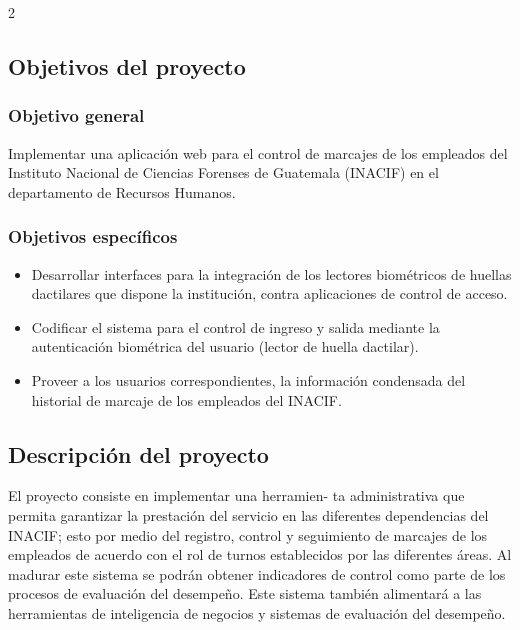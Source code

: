 \documentclass[12pt,spanish,Letterpaper,openany]{book}
\providecommand{\tightlist}{%
  \setlength{\itemsep}{0pt}\setlength{\parskip}{0pt}}
\begin{document}
\begin {multicols}{2}
\begin {flushleft}
\begin{minipage}[c]{\columnwidth}
\end{minipage}

\end {flushleft}

\hypertarget{objetivos-del-proyecto}{%
\subsection{Objetivos del proyecto}\label{objetivos-del-proyecto}}

\hypertarget{objetivo-general}{%
\subsubsection{Objetivo general}\label{objetivo-general}}

Implementar una aplicación web para el control de marcajes de los empleados del Instituto Nacional de Ciencias Forenses de Guatemala (INACIF) en el departamento de Recursos Humanos.

\hypertarget{objetivos-especuxedficos}{%
\subsubsection{Objetivos específicos}\label{objetivos-especuxedficos}}

\begin{itemize}
\tightlist
\item
  Desarrollar interfaces para la integración de los lectores biométricos de huellas
  dactilares que dispone la institución, contra aplicaciones de control de acceso.
\item
  Codificar el sistema para el control de ingreso y salida mediante la
  autenticación biométrica del usuario (lector de huella dactilar).
\item
  Proveer a los usuarios correspondientes, la información condensada del historial
  de marcaje de los empleados del INACIF.
\end{itemize}

\hypertarget{descripciuxf3n-del-proyecto}{%
\subsection{Descripción del proyecto}\label{descripciuxf3n-del-proyecto}}

El proyecto consiste en implementar una herramien-
ta administrativa que permita garantizar la prestación del servicio en las diferentes dependencias del INACIF; esto por medio del registro, control y seguimiento de marcajes de los empleados de acuerdo con el rol de turnos establecidos por las diferentes áreas. Al madurar este sistema se podrán obtener indicadores de control como parte de los procesos de
evaluación del desempeño. Este sistema también alimentará a las herramientas de inteligencia de negocios y sistemas de evaluación del desempeño.


\end{multicols}
\end{document}
